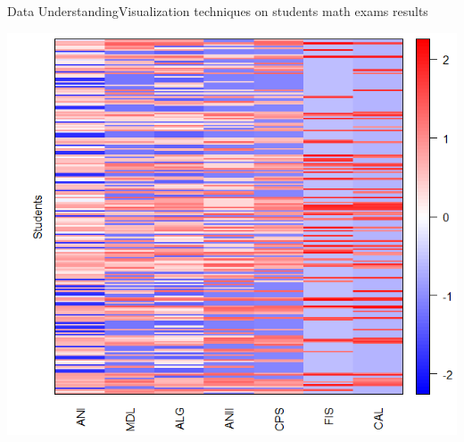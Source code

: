 \begin{frame}{Data Understanding}{Visualization techniques on students math exams results}

    \begin{centering}
        \includegraphics[scale=0.48]{../thesis/img/std_dev_matrix_3.png}
    \end{centering}

\end{frame}